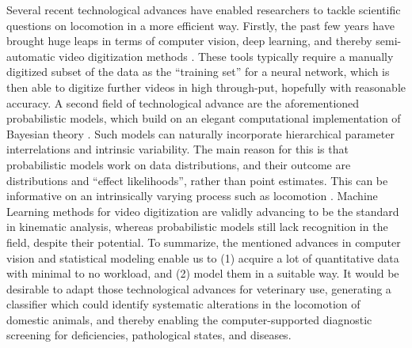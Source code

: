 Several recent technological advances have enabled researchers to tackle scientific questions on locomotion in a more efficient way.
Firstly, the past few years have brought huge leaps in terms of computer vision, deep learning, and thereby semi-automatic video digitization methods \citep{Karashchuk2021,Mathis2020,Jackson2016,Corcoran2021,MMielke2020}.
These tools typically require a manually digitized subset of the data as the ``training set'' for a neural network, which is then able to digitize further videos in high through-put, hopefully with reasonable accuracy.
A second field of technological advance are the aforementioned probabilistic models, which build on an elegant computational implementation of Bayesian theory \citep[Markov Chain Monte Carlo / MCMC sampling, \textit{cf.}][]{McElreath2018,Gelman2013,vandeSchoot2021}.
Such models can naturally incorporate hierarchical parameter interrelations and intrinsic variability.
The main reason for this is that probabilistic models work on data distributions, and their outcome are distributions and ``effect likelihoods'', rather than point estimates.
This can be informative on an intrinsically varying process such as locomotion \citep{Mielke2018}.
Machine Learning methods for video digitization are validly advancing to be the standard in kinematic analysis, whereas probabilistic models still lack recognition in the field, despite their potential.
To summarize, the mentioned advances in computer vision and statistical modeling enable us to (1) acquire a lot of quantitative data with minimal to no workload, and (2) model them in a suitable way.
It would be desirable to adapt those technological advances for veterinary use, generating a classifier which could identify systematic alterations in the locomotion of domestic animals, and thereby enabling the computer-supported diagnostic screening for deficiencies, pathological states, and diseases.


\bigskip

